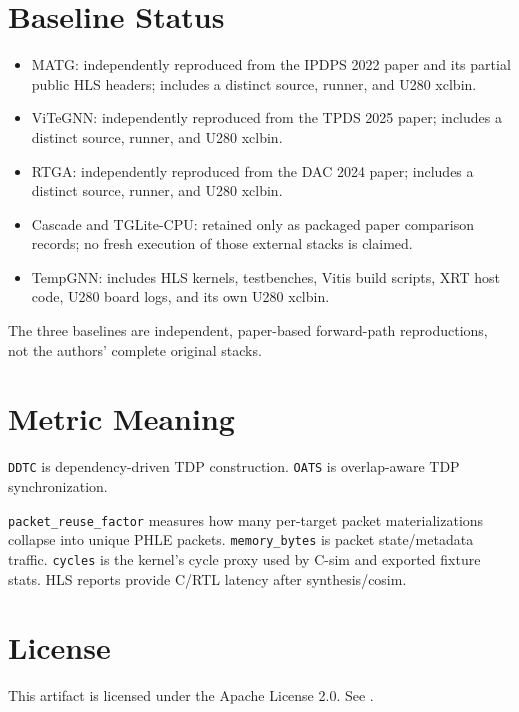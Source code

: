 \documentclass[conference]{IEEEtran}
\begin{document}
\section{Baseline Status}

\begin{itemize}
\item MATG: independently reproduced from the IPDPS 2022 paper and its partial
public HLS headers; includes a distinct source, runner, and U280 xclbin.
\item ViTeGNN: independently reproduced from the TPDS 2025 paper; includes a
distinct source, runner, and U280 xclbin.
\item RTGA: independently reproduced from the DAC 2024 paper; includes a
distinct source, runner, and U280 xclbin.
\item Cascade and TGLite-CPU: retained only as packaged paper comparison
records; no fresh execution of those external stacks is claimed.
\item TempGNN: includes HLS kernels, testbenches, Vitis build scripts, XRT host
code, U280 board logs, and its own U280 xclbin.
\end{itemize}

The three baselines are independent, paper-based forward-path reproductions,
not the authors' complete original stacks.

\section{Metric Meaning}

\texttt{DDTC} is dependency-driven TDP construction. \texttt{OATS} is
overlap-aware TDP synchronization.

\texttt{packet\_reuse\_factor} measures how many per-target packet
materializations collapse into unique PHLE packets. \texttt{memory\_bytes} is
packet state/metadata traffic. \texttt{cycles} is the kernel's cycle proxy used
by C-sim and exported fixture stats. HLS reports provide C/RTL latency after
synthesis/cosim.

\section{License}

This artifact is licensed under the Apache License 2.0. See .
\end{document}
